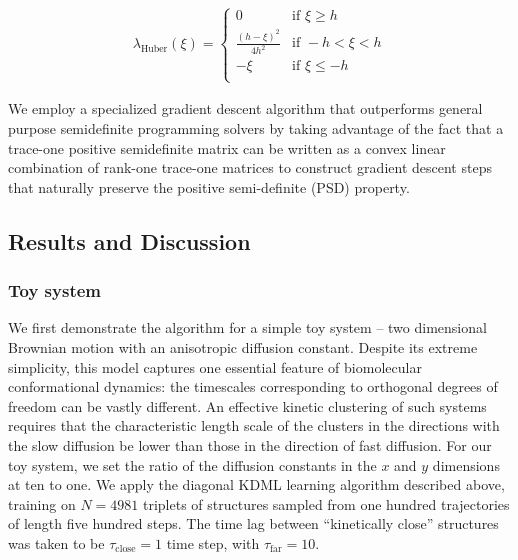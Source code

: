 \documentclass[twocolumn,floatfix,nofootinbib,aps]{revtex4-1}
\begin{document}
\begin{align}
    \lambda_\text{Huber}(\xi) = \begin{cases} 0 &\mbox{if } \xi \geq h \\
    \frac{(h-\xi)^2}{4h^2}  &\mbox{if } -h < \xi < h \\
    -\xi  &\mbox{if }  \xi \leq -h \\
    \end{cases}
\end{align}

We employ a specialized gradient descent algorithm\cite{Shen:2010df} that outperforms general purpose semidefinite programming solvers by taking advantage of the fact that a trace-one positive semidefinite matrix can be written as a convex linear combination of rank-one trace-one matrices\cite{Shen:2008aa} to construct gradient descent steps that naturally preserve the positive semi-definite (PSD) property.

\subsection{Results and Discussion}
\subsubsection{Toy system}
We first demonstrate the algorithm for a simple toy system -- two dimensional Brownian motion with an anisotropic diffusion constant. Despite its extreme simplicity, this model captures one essential feature of biomolecular conformational dynamics: the timescales corresponding to orthogonal degrees of freedom can be vastly different. An effective kinetic clustering of such systems requires that the characteristic length scale of the clusters in the directions with the slow diffusion be lower than those in the direction of fast diffusion. For our toy system, we set the ratio of the diffusion constants in the $x$ and $y$ dimensions at ten to one. We apply the diagonal KDML learning algorithm described above, training on $N=4981$ triplets of structures sampled from one hundred trajectories of length five hundred steps. The time lag between ``kinetically close'' structures was taken to be $\tau_\mathrm{close} = 1$ time step, with $\tau_\mathrm{far} = 10$.
\end{document}
